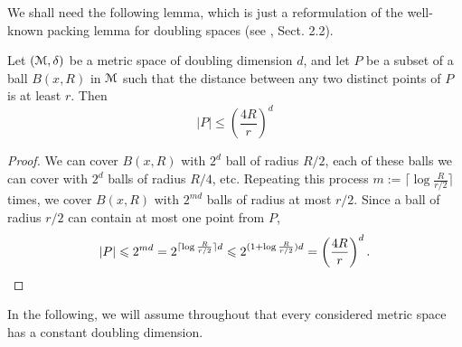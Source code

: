 \documentclass[a4paper,UKenglish,cleveref, autoref]{lipics-v2019}
\begin{document}
We shall need the following lemma, which is just a reformulation of the well-known
packing lemma for doubling spaces (see \cite{smid_2009}, Sect. 2.2).

\begin{lemma}
\label{lem:packing_lemma}
 Let $(\metricspace,\dist)$ be a metric space of doubling dimension $d$, and let $P$ be a subset of a ball 
 $B(x,R)$ in $\metricspace$ such that the distance between any two distinct points of $P$ is at least $r$.
 Then 
 \[|P|\leq \left(\frac{4R}{r}\right)^{d}\]

\end{lemma}
\begin{proof}
We can cover $B(x,R)$ with $2^d$ ball of radius $R/2$, each of these balls we can cover with $2^d$
balls of radius $R/4$, etc. Repeating this process $m := \lceil \log \frac{R}{r/2} \rceil$ times, 
we cover
$B(x, R)$ with $2^{md}$ balls of radius at most $r/2$. Since a ball of radius $r/2$ can
contain at most one point from $P$, 
\[|P|\leq 2^{md}= 2^{\lceil \log \frac{R}{r/2} \rceil d}\leq 2^{(1 + \log \frac{R}{r/2})d}=\left(\frac{4R}{r}\right)^{d}.\qedhere\]
\end{proof}

In the following, we will assume throughout that every considered metric space
has a constant doubling dimension.
\end{document}
